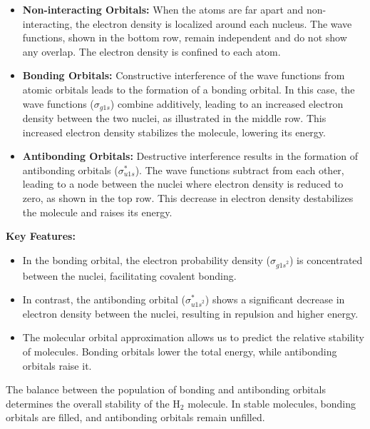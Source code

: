 \documentclass{report}
\begin{document}
\begin{itemize}
	\item \textbf{Non-interacting Orbitals:}
	      When the atoms are far apart and non-interacting, the electron density is localized around each nucleus. The wave functions, shown in the bottom row, remain independent and do not show any overlap. The electron density is confined to each atom.

	\item \textbf{Bonding Orbitals:}
	      Constructive interference of the wave functions from atomic orbitals leads to the formation of a bonding orbital. In this case, the wave functions ($\sigma_{g1s}$) combine additively, leading to an increased electron density between the two nuclei, as illustrated in the middle row. This increased electron density stabilizes the molecule, lowering its energy.

	\item \textbf{Antibonding Orbitals:}
	      Destructive interference results in the formation of antibonding orbitals ($\sigma^*_{u1s}$). The wave functions subtract from each other, leading to a node between the nuclei where electron density is reduced to zero, as shown in the top row. This decrease in electron density destabilizes the molecule and raises its energy.
\end{itemize}

\textbf{Key Features:}

\begin{itemize}

	\item In the bonding orbital, the electron probability density ($\sigma_{{g1s}^2}$) is concentrated between the nuclei, facilitating covalent bonding.
	\item In contrast, the antibonding orbital ($\sigma^{*}_{{u1s}^2}$) shows a significant decrease in electron density between the nuclei, resulting in repulsion and higher energy.
	\item The molecular orbital approximation allows us to predict the relative stability of molecules. Bonding orbitals lower the total energy, while antibonding orbitals raise it.

\end{itemize}


The balance between the population of bonding and antibonding orbitals determines the overall stability of the H$_2$ molecule. In stable molecules, bonding orbitals are filled, and antibonding orbitals remain unfilled.
\end{document}
